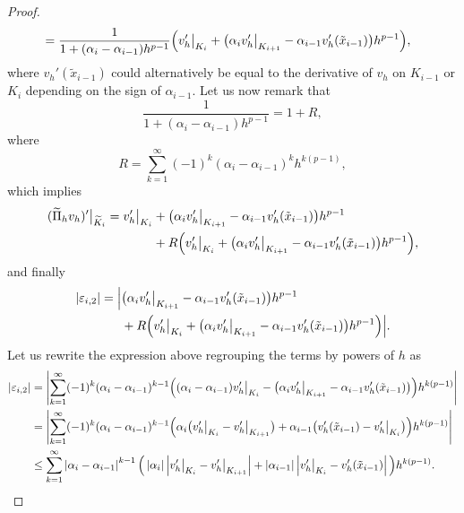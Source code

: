 \documentclass[10pt]{article}
\begin{document}
\begin{proof}
\begin{equation}
\begin{aligned}
		&= \frac{1}{1 + (\alpha_i - \alpha_{i-1})h^{p-1}} \Big(v_h'\bigr\rvert_{K_i} + \big(\alpha_i v_h'\bigr\rvert_{K_{i+1}} - \alpha_{i-1} v_h'(\tilde x_{i-1}) \big) h^{p-1} \Big),
	\end{aligned}
	\end{equation}
	where $v_h'(\tilde x_{i-1})$ could alternatively be equal to the derivative of $v_h$ on $K_{i-1}$ or $K_i$ depending on the sign of $\alpha_{i-1}$.	Let us now remark that
	\begin{equation}
		\frac{1}{1 + (\alpha_i - \alpha_{i-1})h^{p-1}} = 1 + R,
	\end{equation}
	where
	\begin{equation}
		R = \sum_{k=1}^\infty (-1)^k(\alpha_i - \alpha_{i-1})^k h^{k(p-1)},
	\end{equation}
	which implies
	\begin{equation}
	\begin{aligned}
		(\widetilde \Pi_hv_h)'\bigr\rvert_{\widetilde K_i} = v_h'\bigr\rvert_{K_i} &+ \big(\alpha_i v_h'\bigr\rvert_{K_{i+1}} - \alpha_{i-1} v_h'(\tilde x_{i-1}) \big) h^{p-1} \\
		&+ R \Big(v_h'\bigr\rvert_{K_i} + \big(\alpha_i v_h'\bigr\rvert_{K_{i+1}} - \alpha_{i-1} v_h'(\tilde x_{i-1}) \big)h^{p-1}\Big),
	\end{aligned}
	\end{equation}
	and finally
	\begin{equation}
	\begin{aligned}
		\left\lvert\varepsilon_{i,2}\right\rvert = \Bigl|&\big(\alpha_i v_h'\bigr\rvert_{K_{i+1}} - \alpha_{i-1} v_h'(\tilde x_{i-1}) \big) h^{p-1} \\
		&+ R \Big(v_h'\bigr\rvert_{K_i} + \big(\alpha_i v_h'\bigr\rvert_{K_{i+1}} - \alpha_{i-1} v_h'(\tilde x_{i-1}) \big)h^{p-1}\Big) \Bigr|.
	\end{aligned}
	\end{equation}
	Let us rewrite the expression above regrouping the terms by powers of $h$ as
	\begin{equation}
	\begin{aligned}
		\abs{\epl_{i,2}} &= \abs{\sum_{k=1}^{\infty} (-1)^k(\alpha_i - \alpha_{i-1})^{k-1}\Big((\alpha_i - \alpha_{i-1}) v_h'\eval{K_i} - \big(\alpha_i v_h'\eval{K_{i+1}} - \alpha_{i-1} v_h'(\tilde x_{i-1}) \big)\Big) h^{k(p-1)}}\\
		&= \abs{\sum_{k=1}^{\infty} (-1)^k(\alpha_i - \alpha_{i-1})^{k-1}\Big(\alpha_i \big(v_h'\eval{K_i} - v_h'\eval{K_{i+1}}\big) + \alpha_{i-1}\big(v_h'(\tilde x_{i-1}) - v_h'\eval{K_i}\big) \Big) h^{k(p-1)}} \\
		&\leq \sum_{k=1}^{\infty} \abs{\alpha_i - \alpha_{i-1}}^{k-1}\Big(\abs{\alpha_i}\abs{v_h'\eval{K_i} - v_h'\eval{K_{i+1}}} + \abs{\alpha_{i-1}} \abs{v_h'\eval{K_i} - v_h'(\tilde x_{i-1})} \Big) h^{k(p-1)}.

\end{aligned}
\end{equation}
\end{proof}
\end{document}
